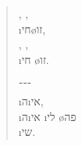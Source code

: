 \begin{verse}
	, ,\\
	\i{חי}\o{זו},\\
	, ,\\
	\i{חי} \o{זו}.

	־־־\\
	\i{ה}\i{אי},\\
	\i{ה}\i{אי} \i{לי} \o{פה}\\
	 \i{שי}.
\end{verse}
